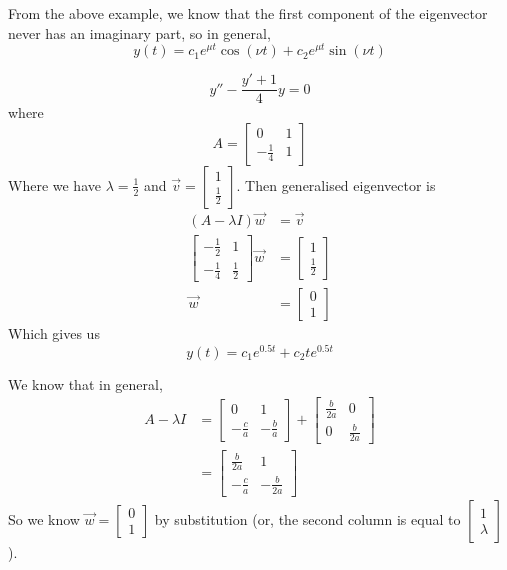 \documentclass[12pt]{article}
\begin{document}
From the above example, we know that the first component of the eigenvector never has an imaginary part, so in general,
$$y(t) = c_1e^{\mu t}\cos(\nu t) + c_2e^{\mu t}\sin(\nu t)$$
	
\begin{ex}
	$$y''-\frac{y'+1}{4}y = 0$$
	where
	$$A = \begin{bmatrix} 0 & 1 \\ -\frac{1}{4} & 1\end{bmatrix}$$
	Where we have $\lambda = \frac{1}{2}$ and $\vec{v} = \begin{bmatrix} 1 \\ \frac{1}{2}\end{bmatrix}$. Then generalised eigenvector is
	\begin{align*}
		(A-\lambda I)\vec{w} &= \vec{v} \\
		\begin{bmatrix} -\frac{1}{2} & 1 \\ -\frac{1}{4} & \frac{1}{2}\end{bmatrix}\vec{w} &= \begin{bmatrix} 1 \\ \frac{1}{2}\end{bmatrix} \\
		\vec{w} &= \begin{bmatrix} 0 \\1\end{bmatrix}
	\end{align*}
	Which gives us
	$$y(t) = c_1e^{0.5t} + c_2te^{0.5t}$$
\end{ex}

We know that in general,
\begin{align*}
	A - \lambda I &= \begin{bmatrix} 0 & 1 \\ -\frac{c}{a} & -\frac{b}{a}\end{bmatrix} + \begin{bmatrix} \frac{b}{2a} & 0 \\ 0 & \frac{b}{2a}\end{bmatrix} \\
		      &= \begin{bmatrix} \frac{b}{2a} & 1 \\ -\frac{c}{a} & -\frac{b}{2a}\end{bmatrix}
\end{align*}
So we know $\vec{w} = \begin{bmatrix} 0 \\ 1\end{bmatrix}$ by substitution (or, the second column is equal to $\begin{bmatrix} 1 \\ \lambda\end{bmatrix}$).
\end{document}
